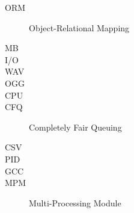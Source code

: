 \begin{description}
  \item[ORM] Object-Relational Mapping %
  \item[MB] %
  \item[I/O] %
  \item[WAV] %
  \item[OGG] %
  \item[CPU] %
  \item[CFQ] Completely Fair Queuing %
  \item[CSV] %
  \item[PID] %
  \item[GCC] %
  \item[MPM] Multi-Processing Module %
\end{description}



